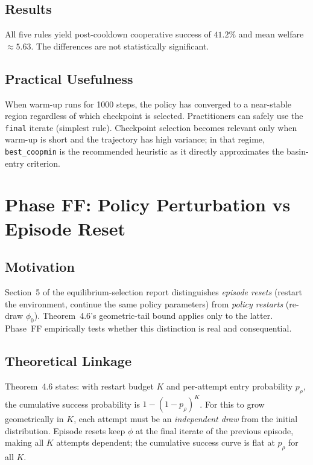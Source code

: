 \documentclass[11pt,a4paper]{article}
\begin{document}
\subsection{Results}



All five rules yield post-cooldown cooperative success of $41.2\%$ and
mean welfare $\approx5.63$. The differences are not statistically significant.

\subsection{Practical Usefulness}

When warm-up runs for 1000 steps, the policy has converged to a near-stable
region regardless of which checkpoint is selected. Practitioners can safely
use the \texttt{final} iterate (simplest rule). Checkpoint selection becomes
relevant only when warm-up is short and the trajectory has high variance;
in that regime, \texttt{best\_coopmin} is the recommended heuristic as it
directly approximates the basin-entry criterion.

\section{Phase FF: Policy Perturbation vs Episode Reset}
\label{sec:ff}

\subsection{Motivation}

Section~5 of the equilibrium-selection report distinguishes \emph{episode
resets} (restart the environment, continue the same policy parameters) from
\emph{policy restarts} (re-draw $\phi_0$). Theorem~4.6's geometric-tail bound
applies only to the latter. Phase~FF empirically tests whether this
distinction is real and consequential.

\subsection{Theoretical Linkage}

Theorem~4.6 states: with restart budget $K$ and per-attempt entry probability
$p_\rho$, the cumulative success probability is $1-(1-p_\rho)^K$.
For this to grow geometrically in $K$, each attempt must be an
\emph{independent draw} from the initial distribution. Episode resets keep
$\phi$ at the final iterate of the previous episode, making all $K$ attempts
dependent; the cumulative success curve is flat at $p_\rho$ for all $K$.
\end{document}
